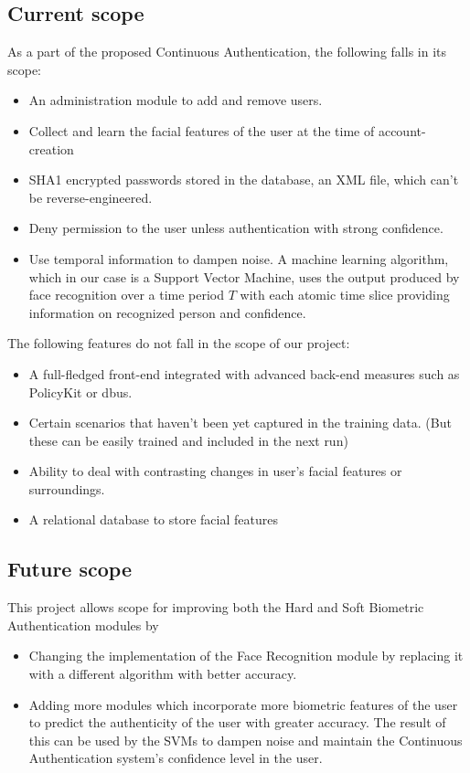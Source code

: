 \documentclass[12pt]{article}			%
\begin{document}
\subsection{ Current scope }
As a part of the proposed Continuous Authentication, the following falls in its scope:
\begin{itemize}
	\item An administration module to add and remove users.
	\item Collect and learn the facial features of the user at the time of account-creation
	\item SHA1 encrypted passwords stored in the database, an XML file, which can't be reverse-engineered.
	\item Deny permission to the user unless authentication with strong confidence.
	\item Use temporal information to dampen noise. A machine learning algorithm, which in our case is a Support Vector Machine, uses the output produced by face recognition over a time period $T$ with each atomic time slice providing information on recognized person and confidence.
\end{itemize}

\noindent The following features do not fall in the scope of our project:
\begin{itemize}
	\item A full-fledged front-end integrated with advanced back-end measures such as PolicyKit or dbus. 
	\item Certain scenarios that haven't been yet captured in the training data. (But these can be easily trained and included in the next run)
	\item Ability to deal with contrasting changes in user's facial features or surroundings.
	\item A relational database to store facial features
\end{itemize}

\subsection{ Future scope } 
This project allows scope for improving both the Hard and Soft Biometric Authentication modules by
\begin{itemize}
\item Changing the implementation of the Face Recognition module by replacing it with a different algorithm with better accuracy.
\item Adding more modules which incorporate more biometric features of the user to predict the authenticity of the user with greater accuracy. The result of this can be used by the SVMs to dampen noise and maintain the Continuous Authentication system's confidence level in the user.  
\end{itemize}
\end{document}
